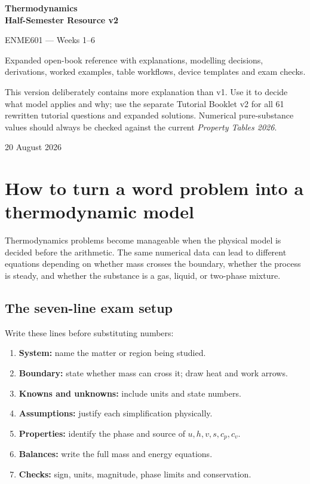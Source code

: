 \documentclass[10pt,a4paper]{article}
\begin{document}
\begin{titlepage}\centering\vspace*{23mm}
{\Huge\bfseries Thermodynamics\\Half-Semester Resource v2\par}\vspace{5mm}
{\Large ENME601 --- Weeks 1--6\par}\vspace{11mm}
{\large Expanded open-book reference with explanations, modelling decisions, derivations, worked examples, table workflows, device templates and exam checks.\par}
\vfill
\begin{quick}[Purpose]
This version deliberately contains more explanation than v1. Use it to decide what model applies and why; use the separate Tutorial Booklet v2 for all 61 rewritten tutorial questions and expanded solutions. Numerical pure-substance values should always be checked against the current \textit{Property Tables 2026}.
\end{quick}
\vfill 20 August 2026
\end{titlepage}
\tableofcontents\newpage

\section{How to turn a word problem into a thermodynamic model}
Thermodynamics problems become manageable when the physical model is decided before the arithmetic. The same numerical data can lead to different equations depending on whether mass crosses the boundary, whether the process is steady, and whether the substance is a gas, liquid, or two-phase mixture.

\subsection{The seven-line exam setup}
Write these lines before substituting numbers:
\begin{enumerate}
\item \textbf{System:} name the matter or region being studied.
\item \textbf{Boundary:} state whether mass can cross it; draw heat and work arrows.
\item \textbf{Knowns and unknowns:} include units and state numbers.
\item \textbf{Assumptions:} justify each simplification physically.
\item \textbf{Properties:} identify the phase and source of $u,h,v,s,c_p,c_v$.
\item \textbf{Balances:} write the full mass and energy equations.
\item \textbf{Checks:} sign, units, magnitude, phase limits and conservation.
\end{enumerate}
\end{document}
